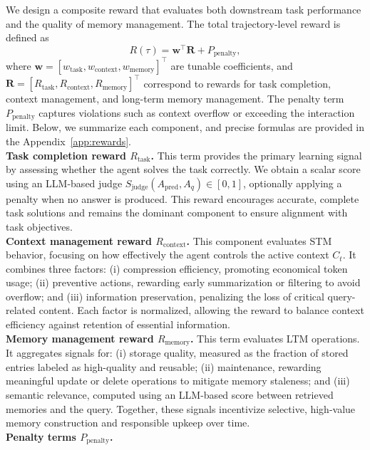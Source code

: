 We design a composite reward that evaluates both downstream task performance and the quality of memory management. The total trajectory-level reward is defined as
\begin{equation}
R(\tau) = \mathbf{w}^\top \mathbf{R} + P_{\text{penalty}},
\end{equation}
where $\mathbf{w} = [w_{\text{task}}, w_{\text{context}}, w_{\text{memory}}]^\top$ are tunable coefficients, and $\mathbf{R} = [R_{\text{task}}, R_{\text{context}}, R_{\text{memory}}]^\top$ correspond to rewards for task completion, context management, and long-term memory management. The penalty term $P_{\text{penalty}}$ captures violations such as context overflow or exceeding the interaction limit. Below, we summarize each component, and precise formulas are provided in the Appendix~\ref{app:rewards}.
\\
\textbf{Task completion reward $R_{\text{task}}$.}  
This term provides the primary learning signal by assessing whether the agent solves the task correctly. We obtain a scalar score using an LLM-based judge $S_{\text{judge}}(A_{\text{pred}}, A_q) \in [0,1]$, optionally applying a penalty when no answer is produced. This reward encourages accurate, complete task solutions and remains the dominant component to ensure alignment with task objectives.
\\
\textbf{Context management reward $R_{\text{context}}$.}  
This component evaluates STM behavior, focusing on how effectively the agent controls the active context $C_t$. It combines three factors: (i) compression efficiency, promoting economical token usage; (ii) preventive actions, rewarding early summarization or filtering to avoid overflow; and (iii) information preservation, penalizing the loss of critical query-related content. Each factor is normalized, allowing the reward to balance context efficiency against retention of essential information.
\\
\textbf{Memory management reward $R_{\text{memory}}$.}
This term evaluates LTM operations. It aggregates signals for: (i) storage quality, measured as the fraction of stored entries labeled as high-quality and reusable; (ii) maintenance, rewarding meaningful update or delete operations to mitigate memory staleness; and (iii) semantic relevance, computed using an LLM-based score between retrieved memories and the query. Together, these signals incentivize selective, high-value memory construction and responsible upkeep over time.
\\
\textbf{Penalty terms $P_{\text{penalty}}$.}  
